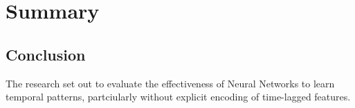 
\chapter{Summary} %

\label{Chapter6} 

\section{Conclusion}

The research set out to evaluate the effectiveness of Neural Networks to learn temporal patterns, partciularly without explicit encoding of time-lagged features.

